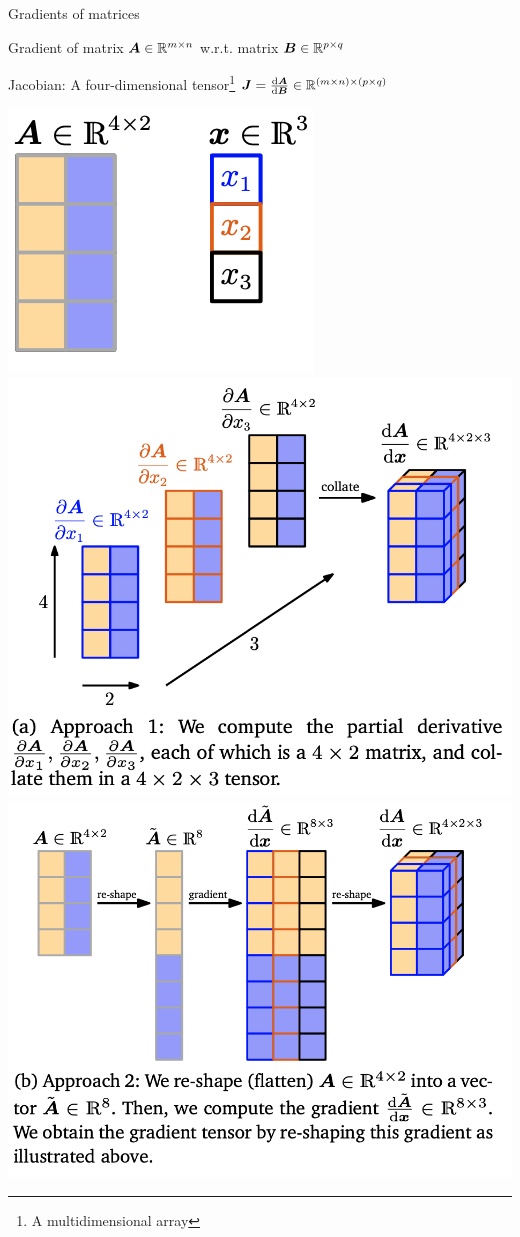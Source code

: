 \documentclass[handout,fleqn,aspectratio=169]{beamer}
\begin{document}
\begin{frame}{Gradients of matrices}

\plitemsep 0.1in

\bci 
\item Gradient of matrix $\bm{A} \in {\mathbb R}^{m \times n}$ w.r.t. matrix $\bm{B} \in {\mathbb R}^{p \times q}$ 

\item Jacobian: A four-dimensional tensor\footnote{A multidimensional array} $\bm{J} = \frac{\text{d} \bm{A}}{\text{d} \bm{B}} \in {\mathbb R}^{(m \times n) \times (p \times q)}$

\eci

{
\includegraphics[width=0.9\columnwidth]{L5_grad_matrix_1.png}
}
{
\includegraphics[width=0.47\columnwidth]{L5_grad_matrix_2.png}
\includegraphics[width=0.47\columnwidth]{L5_grad_matrix_3.png}
}




\end{frame}
\end{document}
